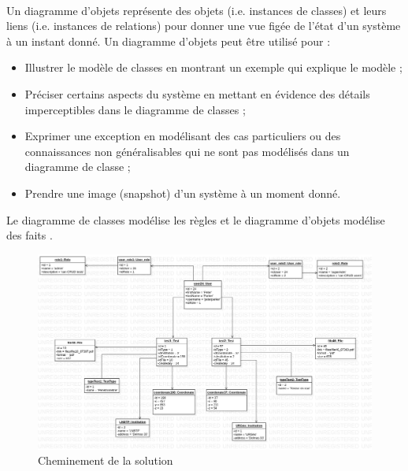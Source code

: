     \paragraph{}
    Un diagramme d'objets représente des objets (i.e. instances 
    de classes) et leurs liens (i.e. instances de relations) 
    pour donner une vue figée de l'état d'un système à un 
    instant donné. Un diagramme d'objets peut être utilisé pour :
    \begin{itemize}
        \item Illustrer le modèle de classes en montrant un exemple qui explique le modèle ;
        \item Préciser certains aspects du système en mettant en évidence des détails imperceptibles dans le diagramme de classes ;
        \item Exprimer une exception en modélisant des cas particuliers ou des connaissances non généralisables 
        qui ne sont pas modélisés dans un diagramme de classe ;
        \item Prendre une image (snapshot) d'un système à un moment donné.
    \end{itemize}
    Le diagramme de classes modélise les règles et le diagramme d'objets 
    modélise des faits \cite{audibert2009uml}.
    \begin{figure}[t]
        \centering
        \includegraphics[width=1\textwidth]{images/Analyse_des_besoins/ObjectDiagram.jpg}
        \caption{Cheminement de la solution}
        \label{fig:ObjectDiagram}
    \end{figure}

